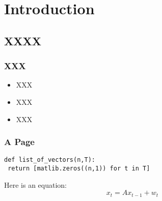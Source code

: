 \documentclass{beamer}
\title{\talktitle}
\author{\Us}
\date{\talkdate}
\begin{document}
\begin{frame}
  \titlepage
  \conferencebanner
\end{frame}

\section[Outline]{}
\begin{frame}
  \tableofcontents
\end{frame}

\section{Introduction}
\subsection{XXXX}
\begin{frame}
  \frametitle{XXX}

  \begin{itemize}
  \item<1-> XXX
  \item<2-> XXX
  \item<3-> XXX      
  \end{itemize}
\end{frame}

\begin{frame}
  \sudokuexampleone
\end{frame}

\begin{frame}[fragile]
\frametitle{A Page}
\begin{lstlisting}
def list_of_vectors(n,T):
 return [matlib.zeros((n,1)) for t in T]
\end{lstlisting}
 Here is an equation:
\begin{equation}
 x_t = Ax_{t-1} + w_t
\end{equation}
\end{frame}
\end{document}
